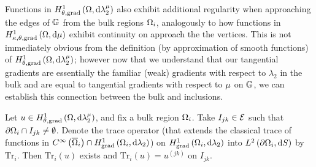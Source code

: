 Functions in $H^1_{\theta, \mathrm{grad}}\left( \Omega, \mathrm{d}\lambda_2^{\mu} \right)$ also exhibit additional regularity when approaching the edges of $\mathbb{G}$ from the bulk regions $\Omega_i$, analogously to how functions in $H^1_{\kappa,\theta,\mathrm{grad}}\left( \Omega, \mathrm{d}\mu \right)$ exhibit continuity on approach the the vertices.
This is not immediately obvious from the definition (by approximation of smooth functions) of $H^1_{\theta, \mathrm{grad}}\left( \Omega, \mathrm{d}\lambda_2^{\mu} \right)$; however now that we understand that our tangential gradients are essentially the familiar (weak) gradients with respect to $\lambda_2$ in the bulk and are equal to tangential gradients with respect to $\mu$ on $\mathbb{G}$, we can establish this connection between the bulk and inclusions.
\begin{theorem} \label{thm:SI-SobFuncEdgeContinuity}
	Let $u\in H^1_{\theta, \mathrm{grad}}\left( \Omega, \mathrm{d}\lambda_2^{\mu} \right)$, and fix a bulk region $\Omega_i$.
	Take $I_{jk}\in\mathcal{E}$ such that $\partial\Omega_i\cap I_{jk}\neq\emptyset$.
	Denote the trace operator (that extends the classical trace of functions in $C^{\infty}\left( \overline{\Omega}_i \right)\cap H^1_\mathrm{grad}\left( \Omega_i, \mathrm{d}\lambda_2 \right)$) on $H^1_\mathrm{grad}\left( \Omega_i, \mathrm{d}\lambda_2 \right)$ into $L^{2}\left( \partial\Omega_i,\mathrm{d} S \right)$ by $\mathrm{Tr}_i$.
	Then $\mathrm{Tr}_i(u)$ exists and $\mathrm{Tr}_i(u) = u^{(jk)}$ on $I_{jk}$.
\end{theorem}
